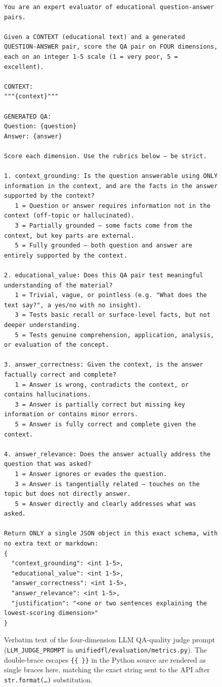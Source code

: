 \documentclass[11pt]{article}
\theoremstyle{plain}
\theoremstyle{definition}
\theoremstyle{remark}
\begin{document}
\begin{figure}[!htbp]
\begin{lstlisting}[style=judgeprompt]
You are an expert evaluator of educational question-answer pairs.

Given a CONTEXT (educational text) and a generated QUESTION-ANSWER pair, score the QA pair on FOUR dimensions, each on an integer 1-5 scale (1 = very poor, 5 = excellent).

CONTEXT:
"""{context}"""

GENERATED QA:
Question: {question}
Answer: {answer}

Score each dimension. Use the rubrics below — be strict.

1. context_grounding: Is the question answerable using ONLY information in the context, and are the facts in the answer supported by the context?
   1 = Question or answer requires information not in the context (off-topic or hallucinated).
   3 = Partially grounded — some facts come from the context, but key parts are external.
   5 = Fully grounded — both question and answer are entirely supported by the context.

2. educational_value: Does this QA pair test meaningful understanding of the material?
   1 = Trivial, vague, or pointless (e.g. "What does the text say?", a yes/no with no insight).
   3 = Tests basic recall or surface-level facts, but not deeper understanding.
   5 = Tests genuine comprehension, application, analysis, or evaluation of the concept.

3. answer_correctness: Given the context, is the answer factually correct and complete?
   1 = Answer is wrong, contradicts the context, or contains hallucinations.
   3 = Answer is partially correct but missing key information or contains minor errors.
   5 = Answer is fully correct and complete given the context.

4. answer_relevance: Does the answer actually address the question that was asked?
   1 = Answer ignores or evades the question.
   3 = Answer is tangentially related — touches on the topic but does not directly answer.
   5 = Answer directly and clearly addresses what was asked.

Return ONLY a single JSON object in this exact schema, with no extra text or markdown:
{
  "context_grounding": <int 1-5>,
  "educational_value": <int 1-5>,
  "answer_correctness": <int 1-5>,
  "answer_relevance": <int 1-5>,
  "justification": "<one or two sentences explaining the lowest-scoring dimension>"
}
\end{lstlisting}
\caption{Verbatim text of the four-dimension LLM
QA-quality judge prompt
(\texttt{LLM\_JUDGE\_PROMPT} in
\texttt{unifiedfl/evaluation/metrics.py}). The
double-brace escapes \texttt{\{\{ \}\}} in the Python
source are rendered as single braces here, matching the
exact string sent to the API after
\texttt{str.format(\ldots)} substitution.}
\label{fig:judge_prompt}
\end{figure}
\end{document}
